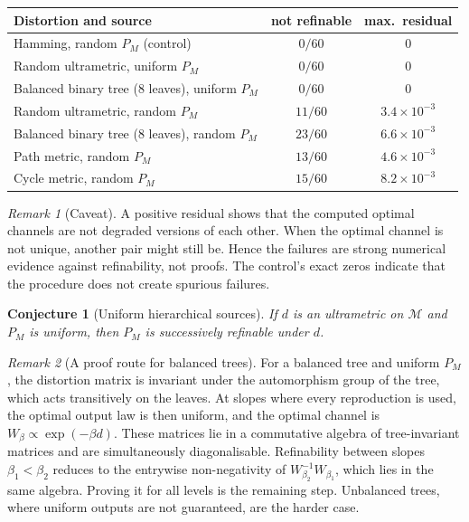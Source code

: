 \documentclass[11pt]{article}
\newtheorem{conjecture}{Conjecture}
\theoremstyle{definition}
\theoremstyle{remark}
\newtheorem{remark}{Remark}
\newcommand{\M}{\mathcal{M}}
\begin{document}
\begin{center}
\begin{tabular}{lcc}
\toprule
Distortion and source & not refinable & max.\ residual\\
\midrule
Hamming, random $P_M$ (control) & $0/60$ & $0$\\
Random ultrametric, uniform $P_M$ & $0/60$ & $0$\\
Balanced binary tree (8 leaves), uniform $P_M$ & $0/60$ & $0$\\
Random ultrametric, random $P_M$ & $11/60$ & $3.4\times10^{-3}$\\
Balanced binary tree (8 leaves), random $P_M$ & $23/60$ & $6.6\times10^{-3}$\\
Path metric, random $P_M$ & $13/60$ & $4.6\times10^{-3}$\\
Cycle metric, random $P_M$ & $15/60$ & $8.2\times10^{-3}$\\
\bottomrule
\end{tabular}
\end{center}

\begin{remark}[Caveat]
A positive residual shows that the computed optimal channels are not degraded versions of each other. When the optimal channel is not unique, another pair might still be. Hence the failures are strong numerical evidence against refinability, not proofs. The control's exact zeros indicate that the procedure does not create spurious failures.
\end{remark}

\begin{conjecture}[Uniform hierarchical sources]\label{conj:sr}
If $d$ is an ultrametric on $\M$ and $P_M$ is uniform, then $P_M$ is successively refinable under $d$.
\end{conjecture}

\begin{remark}[A proof route for balanced trees]
For a balanced tree and uniform $P_M$, the distortion matrix is invariant under the automorphism group of the tree, which acts transitively on the leaves. At slopes where every reproduction is used, the optimal output law is then uniform, and the optimal channel is $W_\beta\propto\exp(-\beta d)$. These matrices lie in a commutative algebra of tree-invariant matrices and are simultaneously diagonalisable. Refinability between slopes $\beta_1<\beta_2$ reduces to the entrywise non-negativity of $W_{\beta_2}^{-1}W_{\beta_1}$, which lies in the same algebra. Proving it for all levels is the remaining step. Unbalanced trees, where uniform outputs are not guaranteed, are the harder case.
\end{remark}
\end{document}
